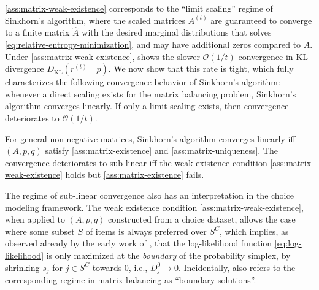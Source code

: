 \cref{ass:matrix-weak-existence} corresponds to the ``limit scaling'' regime of Sinkhorn's algorithm, where the scaled matrices $A^{(t)}$ are guaranteed to converge to a finite matrix $\hat A$ with the desired marginal distributions that solves \eqref{eq:relative-entropy-minimization}, and may have additional zeros compared to $A$. Under \cref{ass:matrix-weak-existence}, \citet{leger2021gradient} shows the slower $\mathcal O(1/t)$ convergence in KL divergence $D_{\text{KL}}(r^{(t)}\| p)$. We now show that this rate is tight, which fully characterizes the following convergence behavior of Sinkhorn's algorithm: whenever a direct scaling exists for the matrix balancing problem, Sinkhorn's algorithm converges linearly. If only a limit scaling exists, then convergence deteriorates to 
$\mathcal O(1/t)$.
\begin{theorem}
\label{thm:lower-bound}
       For general non-negative matrices, Sinkhorn's algorithm converges linearly
iff $(A,p,q)$ satisfy \cref{ass:matrix-existence} and \cref{ass:matrix-uniqueness}. The convergence deteriorates to sub-linear iff the weak existence condition \cref{ass:matrix-weak-existence} holds but \cref{ass:matrix-existence} fails.
\end{theorem}

The regime of sub-linear convergence also has an interpretation in the choice modeling framework. The weak existence condition \cref{ass:matrix-weak-existence}, when applied to $(A,p,q)$ constructed from a choice dataset, allows the case where some subset $S$ of items is always preferred over $S^C$, which implies, as observed already by the early work of \citet{ford1957solution}, that the log-likelihood function \eqref{eq:log-likelihood} is only maximized at the \emph{boundary} of the probability simplex, by shrinking  $s_j$ for $j\in S^C$ towards 0, i.e., $D^0_j \rightarrow 0$. Incidentally, \citet{bacharach1965estimating} also refers to the corresponding regime in matrix balancing as ``boundary solutions''. 

